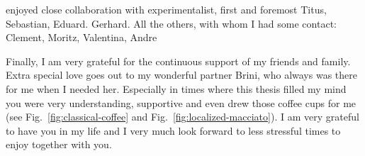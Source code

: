 enjoyed close collaboration with experimentalist, first and foremost Titus, Sebastian, Eduard. Gerhard. All the others, with whom I had some contact: Clement, Moritz, Valentina, Andre


Finally, I am very grateful for the continuous support of my friends and family. Extra special love goes out to my wonderful partner Brini, who always was there for me when I needed her. Especially in times where this thesis filled my mind you were very understanding, supportive and even drew those coffee cups for me (see Fig.~\ref{fig:classical-coffee} and Fig.~\ref{fig:localized-macciato}).
I am very grateful to have you in my life and I very much look forward to less stressful times to enjoy together with you.
\endgroup
